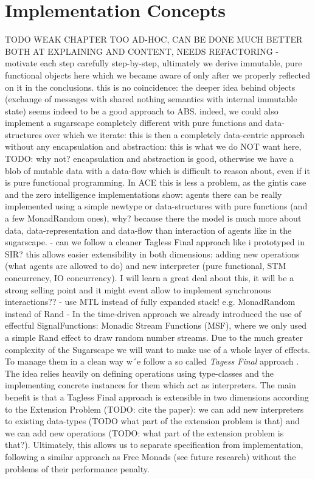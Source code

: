 \section{Implementation Concepts}
\label{sec:eventdriven_implementation}

TODO WEAK CHAPTER TOO AD-HOC, CAN BE DONE MUCH BETTER BOTH AT EXPLAINING AND CONTENT, NEEDS REFACTORING
- motivate each step carefully step-by-step, ultimately we derive immutable, pure functional objects here which we became aware of only after we properly reflected on it in the conclusions. this is no coincidence: the deeper idea behind objects (exchange of messages with shared nothing semantics with internal immutable state) seems indeed to be a good approach to ABS. indeed, we could also implement a sugarscape completely different with pure functions and data-structures over which we iterate: this is then a completely data-centric approach without any encapsulation and abstraction: this is what we do NOT want here, TODO: why not? encapsulation and abstraction is good, otherwise we have a blob of mutable data with a data-flow which is difficult to reason about, even if it is pure functional programming. In ACE this is less a problem, as the gintis case and the zero intelligence implementations show: agents there can be really implemented using a simple newtype or data-structures with pure functions (and a few MonadRandom ones), why? because there the model is much more about data, data-representation and data-flow than interaction of agents like in the sugarscape.
- can we follow a cleaner Tagless Final approach like i prototyped in SIR? this allows easier extensibility in both dimensions: adding new operations (what agents are allowed to do) and new interpreter (pure functional, STM concurrency, IO concurrency). I will learn a great deal about this, it will be a strong selling point and it might event allow to implement synchronous interactions?? 
- use MTL instead of fully expanded stack! e.g. MonadRandom instead of Rand
- In the time-driven approach we already introduced the use of effectful SignalFunctions: Monadic Stream Functions (MSF), where we only used a simple Rand effect to draw random number streams. Due to the much greater complexity of the Sugarscape we will want to make use of a whole layer of effects. To manage them in a clean way w´e follow a so called \textit{Tagess Final} approach \cite{kiselyov_typed_2012}. The idea relies heavily on defining operations using type-classes and the implementing concrete instances for them which act as interpreters. The main benefit is that a Tagless Final approach is extensible in two dimensions according to the Extension Problem (TODO: cite the paper): we can add new interpreters to existing data-types (TODO what part of the extension problem is that) and we can add new operations (TODO: what part of the extension problem is that?). Ultimately, this allows us to separate specification from implementation, following a similar approach as Free Monads (see future research) without the problems of their performance penalty.


